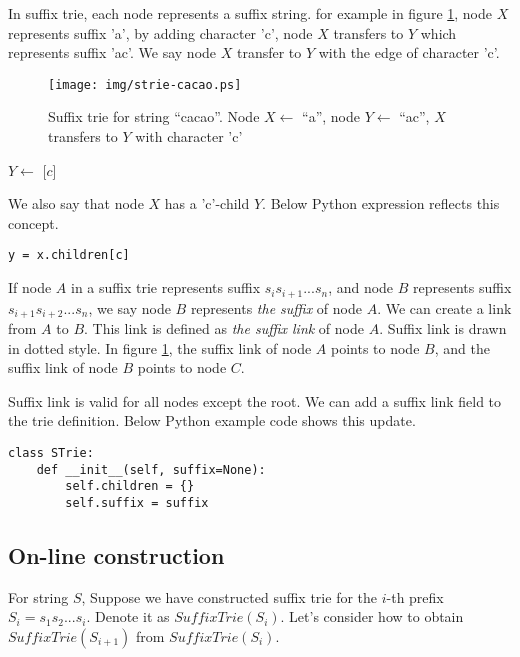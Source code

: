 \documentclass{article}
\begin{document}
In suffix trie, each node represents a suffix string. for example in figure
\ref{fig:strie-cacao}, node $X$ represents suffix 'a', by adding character 'c',
node $X$ transfers to $Y$ which represents suffix 'ac'. We say node $X$ transfer
to $Y$ with the edge of character 'c'\cite{ukkonen95}.

\begin{figure}[htbp]
  \centering
  \texttt{[image: img/strie-cacao.ps]}
  \caption{Suffix trie for string ``cacao''. Node $X \gets$ ``a'', node $Y \gets$ ``ac'', $X$ transfers to $Y$ with character 'c'}
  \label{fig:strie-cacao}
\end{figure}

\begin{algorithmic}
\State $Y \gets$ [$c$]
\end{algorithmic}

We also say that node $X$ has a 'c'-child $Y$. Below Python expression
reflects this concept.

\lstset{language=python}
\begin{lstlisting}
y = x.children[c]
\end{lstlisting}

If node $A$ in a suffix trie represents suffix $s_is_{i+1}...s_n$,
and node $B$ represents suffix $s_{i+1}s_{i+2}...s_n$, we say node $B$
represents {\em the suffix} of node $A$. We can create a link from $A$ to $B$.
This link is defined as {\em the suffix link} of node $A$\cite{ukkonen95}.
Suffix link is drawn in dotted style. In figure \ref{fig:strie-cacao}, the suffix link of
node $A$ points to node $B$, and the suffix link of node $B$ points to node $C$.

Suffix link is valid for all nodes except the root. We can add a suffix link field to
the trie definition. Below Python example code shows this update.

\lstset{language=Python}
\begin{lstlisting}
class STrie:
    def __init__(self, suffix=None):
        self.children = {}
        self.suffix = suffix
\end{lstlisting}

\subsection{On-line construction}

For string $S$, Suppose we have constructed suffix trie for the $i$-th prefix
$S_i=s_1s_2...s_i$. Denote it as $SuffixTrie(S_i)$.
Let's consider how to obtain $SuffixTrie(S_{i+1})$ from $SuffixTrie(S_i)$.
\end{document}
